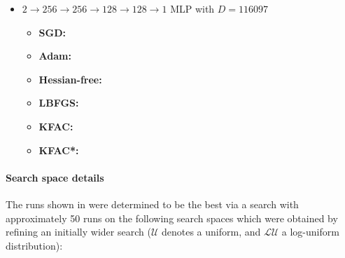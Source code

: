 \begin{itemize}
\item $2 \to 256 \to 256\to 128 \to 128 \to 1$ MLP with $D=\num{116097}$
  \begin{itemize}
    \def\pathToRuns{kfac_pinns_exp/exp23_heat1d_mlp_tanh_256/tex}
  \item \textbf{SGD:} 
  \item \textbf{Adam:} 
  \item \textbf{Hessian-free:} 
  \item \textbf{LBFGS:} 
  \item \textbf{KFAC:} 
  \item \textbf{KFAC*:} 
  \end{itemize}
\end{itemize}

\paragraph{Search space details} The runs shown in  were determined to be the best via a search with approximately 50 runs on the following search spaces which were obtained by refining an initially wider search ($\mathcal{U}$ denotes a uniform, and $\mathcal{LU}$ a log-uniform distribution):

